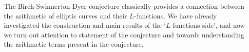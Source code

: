 The Birch-Swinnerton-Dyer conjecture classically provides a connection between the arithmetic of elliptic curves and their $L$-functions. We have already investigated the construction and main results of the `$L$-functions side', and now we turn out attention to statement of the conjecture and towards understanding the arithmetic terms present in the conjecture. 





